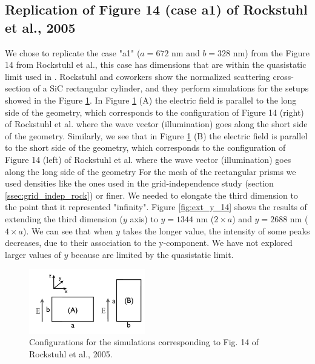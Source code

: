  \subsection{Replication of Figure 14 (case a1) of Rockstuhl et al., 2005}

 We chose to replicate the case "a1" ($a=672$ nm and $b=328$ nm) from the Figure 14 from Rockstuhl et al., 
 this case has dimensions that are within the quasistatic limit used in \pygbe. Rockstuhl and coworkers show the normalized
 scattering cross-section of a SiC rectangular cylinder, and they perform simulations for the setups showed in the Figure
 \ref{fig:rectangle_sketch}. In Figure \ref{fig:rectangle_sketch} (A) the electric field is parallel to the long side of the geometry, which 
 corresponds to the configuration of Figure 14 (right) of Rockstuhl et al. where the wave vector (illumination) goes along the short side of the geometry. 
Similarly, we see that in Figure \ref{fig:rectangle_sketch} (B) the electric field is parallel to the short side of the geometry, which 
corresponds to the configuration of Figure 14 (left) of Rockstuhl et al. where the wave vector (illumination) goes along the long side of the geometry
For the mesh of the rectangular prisms we used densities like the ones used in the grid-independence study (section \ref{ssec:grid_indep_rock}) or finer. We needed to elongate
the third dimension to the point that it represented "infinity". Figure \ref{fig:ext_y_14} shows the results of extending the third dimension ($y$ axis) to 
$y=1344$ nm ($2\times a$) and $y=2688$ nm ($4\times a$). We can see that when $y$ takes the longer value, the intensity of some peaks decreases, due to their association to 
the y-component. We have not explored larger values of $y$ because are limited by the quasistatic limit.
 \begin{figure}
    \centering
    \includegraphics[width=0.45\textwidth]{rockstuhl_rectangles.pdf} 
    \caption{Configurations for the simulations corresponding to Fig. 14 of Rockstuhl et al., 2005.}
    \label{fig:rectangle_sketch}
\end{figure}

